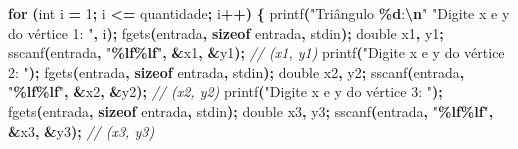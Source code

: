 \documentclass[
  11pt,
  a4paper,
]{scrbook}
\newenvironment{Shaded}{\begin{snugshade}}{\end{snugshade}}
\newcommand{\CommentTok}[1]{\textcolor[rgb]{0.56,0.35,0.01}{\textit{#1}}}
\newcommand{\ControlFlowTok}[1]{\textcolor[rgb]{0.13,0.29,0.53}{\textbf{#1}}}
\newcommand{\DataTypeTok}[1]{\textcolor[rgb]{0.13,0.29,0.53}{#1}}
\newcommand{\DecValTok}[1]{\textcolor[rgb]{0.00,0.00,0.81}{#1}}
\newcommand{\KeywordTok}[1]{\textcolor[rgb]{0.13,0.29,0.53}{\textbf{#1}}}
\newcommand{\NormalTok}[1]{#1}
\newcommand{\OperatorTok}[1]{\textcolor[rgb]{0.81,0.36,0.00}{\textbf{#1}}}
\newcommand{\SpecialCharTok}[1]{\textcolor[rgb]{0.81,0.36,0.00}{\textbf{#1}}}
\newcommand{\StringTok}[1]{\textcolor[rgb]{0.31,0.60,0.02}{#1}}
\begin{document}
\begin{Shaded}
\begin{Highlighting}[]
    \ControlFlowTok{for} \OperatorTok{(}\DataTypeTok{int}\NormalTok{ i }\OperatorTok{=} \DecValTok{1}\OperatorTok{;}\NormalTok{ i }\OperatorTok{\textless{}=}\NormalTok{ quantidade}\OperatorTok{;}\NormalTok{ i}\OperatorTok{++)} \OperatorTok{\{}
\NormalTok{        printf}\OperatorTok{(}\StringTok{"Triângulo }\SpecialCharTok{\%d}\StringTok{:}\SpecialCharTok{\textbackslash{}n}\StringTok{"}
               \StringTok{"Digite x e y do vértice 1: "}\OperatorTok{,}\NormalTok{ i}\OperatorTok{);}
\NormalTok{        fgets}\OperatorTok{(}\NormalTok{entrada}\OperatorTok{,} \KeywordTok{sizeof}\NormalTok{ entrada}\OperatorTok{,}\NormalTok{ stdin}\OperatorTok{);}
        \DataTypeTok{double}\NormalTok{ x1}\OperatorTok{,}\NormalTok{ y1}\OperatorTok{;}
\NormalTok{        sscanf}\OperatorTok{(}\NormalTok{entrada}\OperatorTok{,} \StringTok{"}\SpecialCharTok{\%lf\%lf}\StringTok{"}\OperatorTok{,} \OperatorTok{\&}\NormalTok{x1}\OperatorTok{,} \OperatorTok{\&}\NormalTok{y1}\OperatorTok{);}  \CommentTok{// (x1, y1)}
\NormalTok{        printf}\OperatorTok{(}\StringTok{"Digite x e y do vértice 2: "}\OperatorTok{);}
\NormalTok{        fgets}\OperatorTok{(}\NormalTok{entrada}\OperatorTok{,} \KeywordTok{sizeof}\NormalTok{ entrada}\OperatorTok{,}\NormalTok{ stdin}\OperatorTok{);}
        \DataTypeTok{double}\NormalTok{ x2}\OperatorTok{,}\NormalTok{ y2}\OperatorTok{;}
\NormalTok{        sscanf}\OperatorTok{(}\NormalTok{entrada}\OperatorTok{,} \StringTok{"}\SpecialCharTok{\%lf\%lf}\StringTok{"}\OperatorTok{,} \OperatorTok{\&}\NormalTok{x2}\OperatorTok{,} \OperatorTok{\&}\NormalTok{y2}\OperatorTok{);}  \CommentTok{// (x2, y2)}
\NormalTok{        printf}\OperatorTok{(}\StringTok{"Digite x e y do vértice 3: "}\OperatorTok{);}
\NormalTok{        fgets}\OperatorTok{(}\NormalTok{entrada}\OperatorTok{,} \KeywordTok{sizeof}\NormalTok{ entrada}\OperatorTok{,}\NormalTok{ stdin}\OperatorTok{);}
        \DataTypeTok{double}\NormalTok{ x3}\OperatorTok{,}\NormalTok{ y3}\OperatorTok{;}
\NormalTok{        sscanf}\OperatorTok{(}\NormalTok{entrada}\OperatorTok{,} \StringTok{"}\SpecialCharTok{\%lf\%lf}\StringTok{"}\OperatorTok{,} \OperatorTok{\&}\NormalTok{x3}\OperatorTok{,} \OperatorTok{\&}\NormalTok{y3}\OperatorTok{);}  \CommentTok{// (x3, y3)}


\end{Highlighting}
\end{Shaded}
\end{document}
